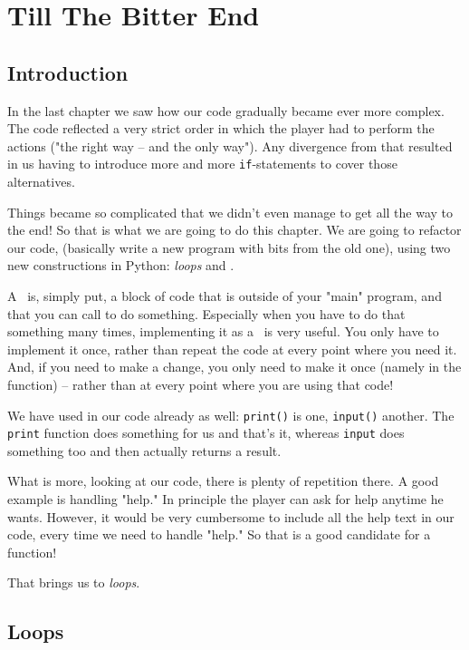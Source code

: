 \chapter{Till The Bitter End} 

\section{Introduction}

In the last chapter we saw how our code gradually became ever more complex. The code reflected a very strict order in which the player had to perform the actions ("the right way -- and the only way"). Any divergence from that resulted in us having to introduce more and more \texttt{if}-statements to cover those alternatives. 

Things became so complicated that we didn't even manage to get all the way to the end! So that is what we are going to do this chapter. We are going to refactor our code, (basically write a new program with bits from the old one), using two new constructions in Python: \textit{loops} and \textit{}.

A \function\ is, simply put, a block of code that is outside of your "main" program, and that you can call to do something. Especially when you have to do that something many times, implementing it as a \function\ is very useful. You only have to implement it once, rather than repeat the code at every point where you need it. And, if you need to make a change, you only need to make it once (namely in the function) -- rather than at every point where you are using that code! 

We have used  in our code already as well: \texttt{print()} is one, \texttt{input()} another. The \texttt{print} function does something for us and that's it, whereas \texttt{input} does something too and then actually returns a result. 

What is more, looking at our code, there is plenty of repetition there. A good example is handling "help." In principle the player can ask for help anytime he wants. However, it would be very cumbersome to include all the help text in our code, every time we need to handle "help." So that is a good candidate for a function!

That brings us to \emph{loops}. 

\section{Loops}

